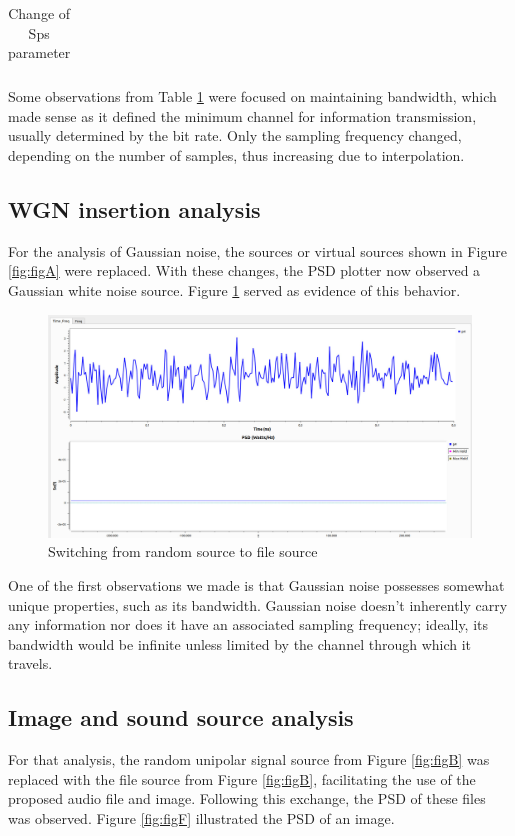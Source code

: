 \documentclass{journal}[IEEEtran, twocolumn]             %
\begin{document}
\begin{multicols}{2}
\begin{table}[H]
\begin{tabular}{ |p{0.5cm}|p{1.1cm}|p{1.9cm}|p{1.1cm}|p{1.5cm}| }
    \hline
    \end{tabular}
    \caption{Change of Sps parameter}
    \label{tab:tabA}
    \end{table}

Some observations from Table \ref{tab:tabA} were focused on maintaining bandwidth, which made sense as it defined the minimum channel for information transmission, usually determined by the bit rate. Only the sampling frequency changed, depending on the number of samples, thus increasing due to interpolation.

\subsection{WGN insertion analysis}
For the analysis of Gaussian noise, the sources or virtual sources shown in Figure \ref{fig:figA} were replaced. With these changes, the PSD plotter now observed a Gaussian white noise source. Figure \ref{fig:figE} served as evidence of this behavior.

\begin{figure}[H]
    \centering
        \centering
        \includegraphics[width=0.7\columnwidth]{figs/AWGN.png}
    \caption{Switching from random source to file source}
    \label{fig:figE}
\end{figure}

One of the first observations we made is that Gaussian noise possesses somewhat unique properties, such as its bandwidth. Gaussian noise doesn't inherently carry any information nor does it have an associated sampling frequency; ideally, its bandwidth would be infinite unless limited by the channel through which it travels.

\subsection{Image and sound source analysis}

For that analysis, the random unipolar signal source from Figure \ref{fig:figB} was replaced with the file source from Figure \ref{fig:figB}, facilitating the use of the proposed audio file and image. Following this exchange, the PSD of these files was observed. Figure \ref{fig:figF} illustrated the PSD of an image.


\end{multicols}
\end{document}
